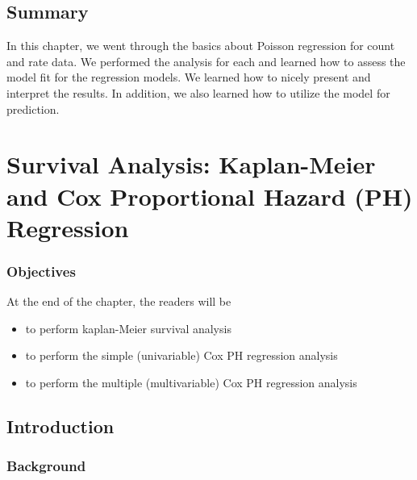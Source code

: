 \documentclass[
  10pt,
]{krantz}
\providecommand{\tightlist}{%
  \setlength{\itemsep}{0pt}\setlength{\parskip}{0pt}}
\begin{document}
\hypertarget{summary-2}{%
\section{Summary}\label{summary-2}}

In this chapter, we went through the basics about Poisson regression for count and rate data. We performed the analysis for each and learned how to assess the model fit for the regression models. We learned how to nicely present and interpret the results. In addition, we also learned how to utilize the model for prediction.

\hypertarget{survival-analysis-kaplan-meier-and-cox-proportional-hazard-ph-regression}{%
\chapter{\texorpdfstring{Survival Analysis: Kaplan-Meier and Cox Proportional Hazard (PH) Regression}{Survival Analysis: Kaplan-Meier and Cox Proportional Hazard (PH) Regression}}\label{survival-analysis-kaplan-meier-and-cox-proportional-hazard-ph-regression}}

\hypertarget{objectives-9}{%
\subsection{Objectives}\label{objectives-9}}

At the end of the chapter, the readers will be

\begin{itemize}
\tightlist
\item
  to perform kaplan-Meier survival analysis
\item
  to perform the simple (univariable) Cox PH regression analysis
\item
  to perform the multiple (multivariable) Cox PH regression analysis
\end{itemize}

\hypertarget{introduction-6}{%
\section{Introduction}\label{introduction-6}}

\hypertarget{background}{%
\subsection{Background}\label{background}}
\end{document}
